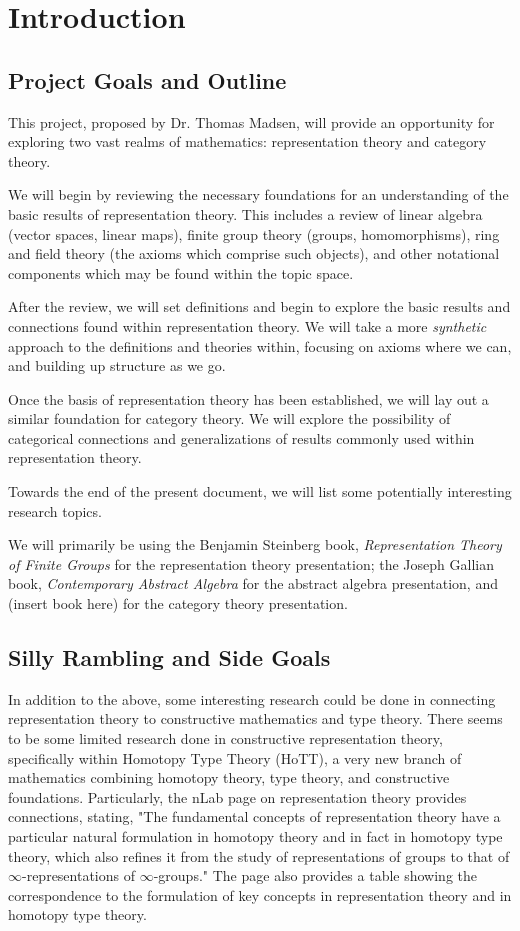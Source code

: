 \section{Introduction}
\subsection{Project Goals and Outline}

This project, proposed by Dr. Thomas Madsen, will provide an opportunity for
exploring two vast realms of mathematics: representation theory and category
theory.

We will begin by reviewing the necessary foundations for an understanding of
the basic results of representation theory. This includes a review of linear
algebra (vector spaces, linear maps), finite group theory (groups,
homomorphisms), ring and field theory (the axioms which comprise such objects),
and other notational components which may be found within the topic space.

After the review, we will set definitions and begin to explore the basic
results and connections found within representation theory. We will take a more
\textit{synthetic} approach to the definitions and theories within, focusing on
axioms where we can, and building up structure as we go.

Once the basis of representation theory has been established, we will lay out
a similar foundation for category theory. We will explore the possibility of
categorical connections and generalizations of results commonly used within
representation theory.

Towards the end of the present document, we will list some potentially
interesting research topics.

We will primarily be using the Benjamin Steinberg book,
\textit{Representation Theory of Finite Groups} \cite{steinberg} for the
representation theory presentation; the Joseph Gallian book,
\textit{Contemporary Abstract Algebra} \cite{gallian} for the abstract algebra
presentation, and (insert book here) for the category theory presentation.

\subsection{Silly Rambling and Side Goals}

In addition to the above, some interesting research could be done in connecting
representation theory to constructive mathematics and type theory. There
seems to be some limited research done in constructive representation theory,
specifically within Homotopy Type Theory (HoTT), a very new branch of
mathematics combining homotopy theory, type theory, and constructive
foundations. Particularly, the nLab page on representation theory
\cite{nlabRT} provides connections, stating, "The fundamental concepts of
representation theory have a particular natural formulation in homotopy theory
and in fact in homotopy type theory, which also refines it from the study of
representations of groups to that of $\infty$-representations of
$\infty$-groups." The page also provides a table showing the correspondence to
the formulation of key concepts in representation theory and in homotopy type
theory.
